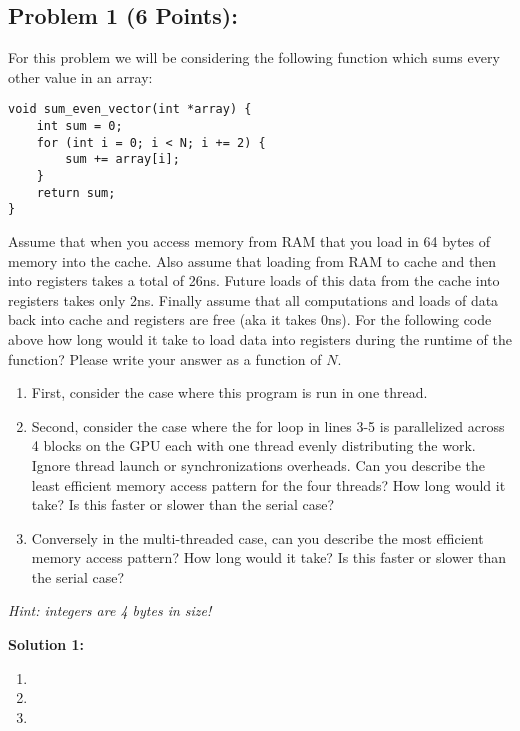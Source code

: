 \documentclass[]{article}
\begin{document}
\subsection*{Problem 1 (6 Points):}
For this problem we will be considering the following function which sums every other value in an array:
\begin{lstlisting}
void sum_even_vector(int *array) {
    int sum = 0;
    for (int i = 0; i < N; i += 2) {
        sum += array[i];
    }
    return sum;
}
\end{lstlisting}
Assume that when you access memory from RAM that you load in 64 bytes of memory into the cache. Also assume that loading from RAM to cache and then into registers takes a total of 26ns. Future loads of this data from the cache into registers takes only 2ns. Finally assume that all computations and loads of data back into cache and registers are free (aka it takes 0ns). For the following code above how long would it take to load data into registers during the runtime of the function? Please write your answer as a function of $N$.
\begin{enumerate}[label=(\alph*)]
    \item First, consider the case where this program is run in one thread.
    \item Second, consider the case where the for loop in lines 3-5 is parallelized across 4 blocks on the GPU each with one thread evenly distributing the work. Ignore thread launch or synchronizations overheads. Can you describe the least efficient memory access pattern for the four threads? How long would it take? Is this faster or slower than the serial case?
    \item Conversely in the multi-threaded case, can you describe the most efficient memory access pattern? How long would it take? Is this faster or slower than the serial case?
\end{enumerate}
\textit{Hint: integers are 4 bytes in size!}

\bigskip
\textbf{Solution 1:}
\begin{enumerate}[label=(\alph*)]
    \item %
    \item %
    \item %
\end{enumerate}
\end{document}
